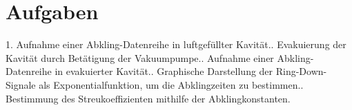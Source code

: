 \section{Aufgaben}

1. Aufnahme einer Abkling-Datenreihe in luftgefüllter Kavität.. Evakuierung der Kavität durch Betätigung der Vakuumpumpe.. Aufnahme einer Abkling-Datenreihe in evakuierter Kavität.. Graphische Darstellung der Ring-Down-Signale als Exponentialfunktion, um die Abklingzeiten zu bestimmen.. Bestimmung des Streukoeffizienten mithilfe der Abklingkonstanten.